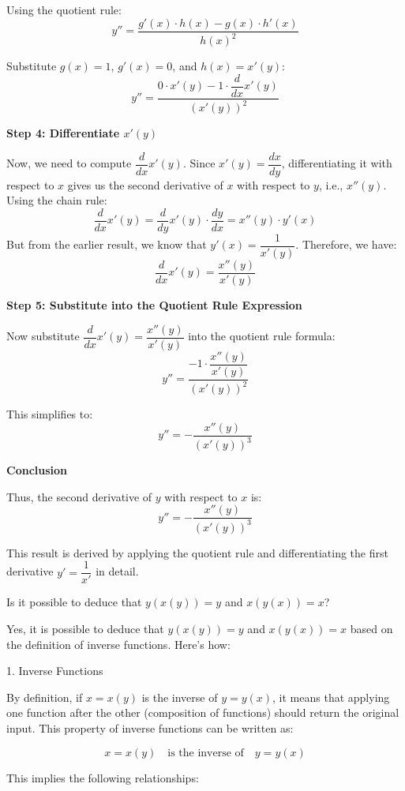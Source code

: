 \documentclass[a4paper,12pt]{book}
\begin{document}
Using the quotient rule:
\[
y'' = \dfrac{g'(x) \cdot h(x) - g(x) \cdot h'(x)}{h(x)^2}
\]

Substitute \( g(x) = 1 \), \( g'(x) = 0 \), and \( h(x) = x'(y) \):
\[
y'' = \dfrac{0 \cdot x'(y) - 1 \cdot \dfrac{d}{dx} x'(y)}{(x'(y))^2}
\]

\textbf{Step 4: Differentiate \( x'(y) \)}

Now, we need to compute \( \dfrac{d}{dx} x'(y) \). Since \( x'(y) = \dfrac{dx}{dy} \), differentiating it with respect to \( x \) gives us the second derivative of \( x \) with respect to \( y \), i.e., \( x''(y) \). Using the chain rule:
\[
\dfrac{d}{dx} x'(y) = \dfrac{d}{dy} x'(y) \cdot \dfrac{dy}{dx} = x''(y) \cdot y'(x)
\]
But from the earlier result, we know that \( y'(x) = \dfrac{1}{x'(y)} \). Therefore, we have:
\[
\dfrac{d}{dx} x'(y) = \dfrac{x''(y)}{x'(y)}
\]

\textbf{Step 5: Substitute into the Quotient Rule Expression}

Now substitute \( \dfrac{d}{dx} x'(y) = \dfrac{x''(y)}{x'(y)} \) into the quotient rule formula:
\[
y'' = \dfrac{-1 \cdot \dfrac{x''(y)}{x'(y)}}{(x'(y))^2}
\]

This simplifies to:
\[
y'' = -\dfrac{x''(y)}{(x'(y))^3}
\]

\textbf{Conclusion}

Thus, the second derivative of \( y \) with respect to \( x \) is:
\[
y'' = -\dfrac{x''(y)}{(x'(y))^3}
\]

This result is derived by applying the quotient rule and differentiating the first derivative \( y' = \dfrac{1}{x'} \) in detail.

\begin{bluebox}
Is it possible to deduce that \(y(x(y))=y\) and \(x(y(x))=x\)?
\end{bluebox}

Yes, it is possible to deduce that \( y(x(y)) = y \) and \( x(y(x)) = x \) based on the definition of inverse functions. Here's how:

1. Inverse Functions

By definition, if \( x = x(y) \) is the inverse of \( y = y(x) \), it means that applying one function after the other (composition of functions) should return the original input. This property of inverse functions can be written as:

\[
x = x(y) \quad \text{is the inverse of} \quad y = y(x)
\]

This implies the following relationships:
\end{document}
